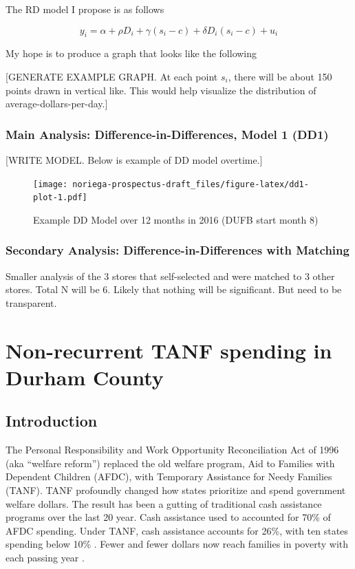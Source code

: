 \documentclass[12pt,letterpaperpaper,]{book}
\begin{document}
The RD model I propose is as follows

\[
y_{i} = \alpha + \rho D_i + \gamma (s_i - c) + \delta D_i(s_i - c) + u_{i}
\]

My hope is to produce a graph that looks like the following

{[}GENERATE EXAMPLE GRAPH. At each point \(s_i\), there will be about
150 points drawn in vertical like. This would help visualize the
distribution of average-dollars-per-day.{]}

\subsection*{Main Analysis: Difference-in-Differences, Model 1
(DD1)}\label{main-analysis-difference-in-differences-model-1-dd1}

{[}WRITE MODEL. Below is example of DD model overtime.{]}

\begin{figure}
\centering
\texttt{[image: noriega-prospectus-draft\_files/figure-latex/dd1-plot-1.pdf]}
\caption{\label{fig:dd1-plot}Example DD Model over 12 months in 2016 (DUFB
start month 8)}
\end{figure}

\subsection*{Secondary Analysis: Difference-in-Differences with
Matching}\label{secondary-analysis-difference-in-differences-with-matching}

Smaller analysis of the 3 stores that self-selected and were matched to
3 other stores. Total N will be 6. Likely that nothing will be
significant. But need to be transparent.

\chapter{Non-recurrent TANF spending in Durham County}\label{chapter-2}

\section*{Introduction}\label{intro-2}

The Personal Responsibility and Work Opportunity Reconciliation Act of
1996 (aka ``welfare reform'') replaced the old welfare program, Aid to
Families with Dependent Children (AFDC), with Temporary Assistance for
Needy Families (TANF). TANF profoundly changed how states prioritize and
spend government welfare dollars. The result has been a gutting of
traditional cash assistance programs over the last 20 year. Cash
assistance used to accounted for 70\% of AFDC spending. Under TANF, cash
assistance accounts for 26\%, with ten states spending below 10\%
\citep{schott_how_2015}. Fewer and fewer dollars now reach families in
poverty with each passing year \citep{cbpp_chart_2016}.
\end{document}
